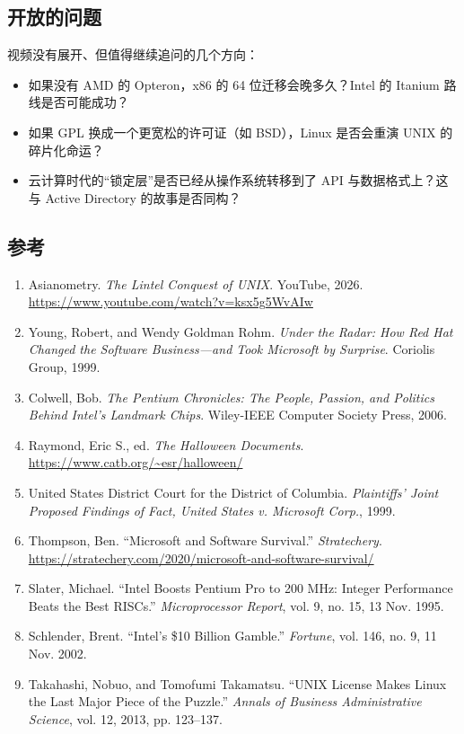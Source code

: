 \documentclass[a4paper]{article}
\begin{document}
\subsection{开放的问题}

视频没有展开、但值得继续追问的几个方向：

\begin{itemize}
\item 如果没有 AMD 的 Opteron，x86 的 64 位迁移会晚多久？Intel 的 Itanium 路线是否可能成功？
\item 如果 GPL 换成一个更宽松的许可证（如 BSD），Linux 是否会重演 UNIX 的碎片化命运？
\item 云计算时代的“锁定层”是否已经从操作系统转移到了 API 与数据格式上？这与 Active Directory 的故事是否同构？
\end{itemize}

\subsection{参考}

\begin{enumerate}
\item Asianometry. \emph{The Lintel Conquest of UNIX}. YouTube, 2026. \url{https://www.youtube.com/watch?v=ksx5g5WvAIw}
\item Young, Robert, and Wendy Goldman Rohm. \emph{Under the Radar: How Red Hat Changed the Software Business---and Took Microsoft by Surprise}. Coriolis Group, 1999.
\item Colwell, Bob. \emph{The Pentium Chronicles: The People, Passion, and Politics Behind Intel's Landmark Chips}. Wiley-IEEE Computer Society Press, 2006.
\item Raymond, Eric S., ed. \emph{The Halloween Documents}. \url{https://www.catb.org/~esr/halloween/}
\item United States District Court for the District of Columbia. \emph{Plaintiffs' Joint Proposed Findings of Fact, United States v. Microsoft Corp.}, 1999.
\item Thompson, Ben. ``Microsoft and Software Survival.'' \emph{Stratechery}. \url{https://stratechery.com/2020/microsoft-and-software-survival/}
\item Slater, Michael. ``Intel Boosts Pentium Pro to 200 MHz: Integer Performance Beats the Best RISCs.'' \emph{Microprocessor Report}, vol. 9, no. 15, 13 Nov. 1995.
\item Schlender, Brent. ``Intel's \$10 Billion Gamble.'' \emph{Fortune}, vol. 146, no. 9, 11 Nov. 2002.
\item Takahashi, Nobuo, and Tomofumi Takamatsu. ``UNIX License Makes Linux the Last Major Piece of the Puzzle.'' \emph{Annals of Business Administrative Science}, vol. 12, 2013, pp. 123--137.
\end{enumerate}

\end{document}
